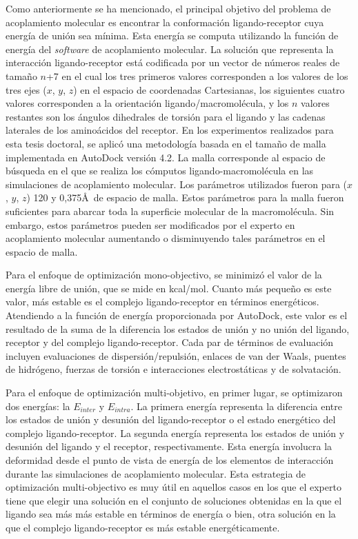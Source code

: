 Como anteriormente se ha mencionado, el principal objetivo del problema de acoplamiento molecular es encontrar la conformación ligando-receptor cuya energía de unión sea mínima. Esta energía se computa utilizando la función de energía del \emph{software} de acoplamiento molecular. La solución que representa la interacción ligando-receptor está codificada por un vector de números reales de tamaño $n$+7 en el cual los tres primeros valores corresponden a los valores de los tres ejes ($x$, $y$, $z$) en el espacio de coordenadas Cartesianas, los siguientes cuatro valores corresponden a la orientación ligando/macromolécula, y los $n$ valores restantes son los ángulos dihedrales de torsión para el ligando y las cadenas laterales de los aminoácidos del receptor. En los experimentos realizados para esta tesis doctoral, se aplicó una metodología basada en el tamaño de malla implementada en AutoDock versión 4.2. La malla corresponde al espacio de búsqueda en el que se realiza los cómputos ligando-macromolécula en las simulaciones de acoplamiento molecular. Los parámetros utilizados fueron para ($x$, $y$, $z$) 120 y 0,375\AA\ de espacio de malla. Estos parámetros para la malla fueron suficientes para abarcar toda la superficie molecular de la macromolécula. Sin embargo, estos parámetros pueden ser modificados por el experto en acoplamiento molecular aumentando o disminuyendo tales parámetros en el espacio de malla.

Para el enfoque de optimización mono-objectivo, se minimizó el valor de la energía libre de unión, que se mide en kcal/mol. Cuanto más pequeño es este valor, más estable es el complejo ligando-receptor en términos energéticos. Atendiendo a la función de energía proporcionada por AutoDock, este valor es el resultado de la suma de la diferencia los estados de unión y no unión del ligando, receptor y del complejo ligando-receptor. Cada par de términos de evaluación incluyen evaluaciones de dispersión/repulsión, enlaces de van der Waals, puentes de hidrógeno, fuerzas de torsión e interacciones electrostáticas y de solvatación.

Para el enfoque de optimización multi-objetivo, en primer lugar, se optimizaron dos energías: la $E_{inter}$ y $E_{intra}$. La primera energía representa la diferencia entre los estados de unión y desunión del ligando-receptor o el estado energético del complejo ligando-receptor. La segunda energía representa los estados de unión y desunión del ligando y el receptor, respectivamente. Esta energía involucra la deformidad desde el punto de vista de energía de los elementos de interacción durante las simulaciones de acoplamiento molecular. Esta estrategia de optimización multi-objectivo es muy útil en aquellos casos en los que el experto tiene que elegir una solución en el conjunto de soluciones obtenidas en la que el ligando sea más más estable en términos de energía o bien, otra solución en la que el complejo ligando-receptor es más estable energéticamente.

